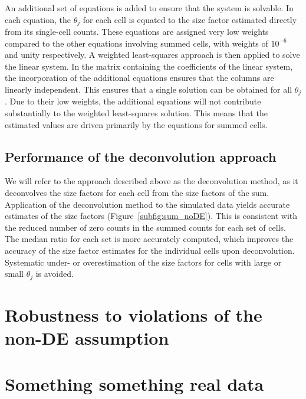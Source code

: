 \documentclass{article}
\begin{document}
An additional set of equations is added to ensure that the system is solvable.
In each equation, the $\theta_j$ for each cell is equated to the size factor estimated directly from its single-cell counts.
These equations are assigned very low weights compared to the other equations involving summed cells, with weights of $10^{-6}$ and unity respectively.
A weighted least-squares approach is then applied to solve the linear system.
In the matrix containing the coefficients of the linear system, the incorporation of the additional equations ensures that the columns are linearly independent.
This ensures that a single solution can be obtained for all $\theta_j$.
Due to their low weights, the additional equations will not contribute substantially to the weighted least-squares solution.
This means that the estimated values are driven primarily by the equations for summed cells.

\subsection{Performance of the deconvolution approach}
We will refer to the approach described above as the deconvolution method, as it deconvolves the size factors for each cell from the size factors of the sum.
Application of the deconvolution method to the simulated data yields accurate estimates of the size factors (Figure~\ref{subfig:sum_noDE}).
This is consistent with the reduced number of zero counts in the summed counts for each set of cells.
The median ratio for each set is more accurately computed, which improves the accuracy of the size factor estimates for the individual cells upon deconvolution.
Systematic under- or overestimation of the size factors for cells with large or small $\theta_j$ is avoided.

\section{Robustness to violations of the non-DE assumption}

\section{Something something real data}



\end{document}
